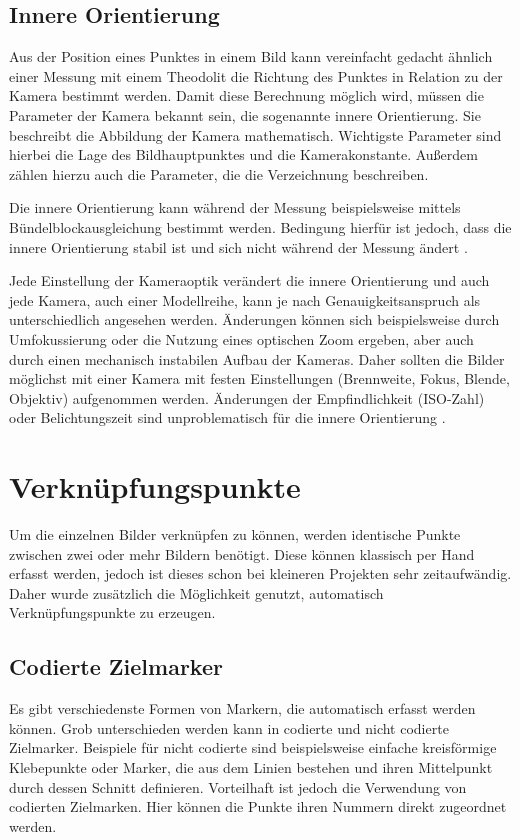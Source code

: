 \documentclass[./00PhotoBox.tex]{subfiles}
\begin{document}

\subsection{Innere Orientierung}
\label{s:innereorientierung}
Aus der Position eines Punktes in einem Bild kann vereinfacht gedacht ähnlich einer Messung mit einem Theodolit die Richtung des Punktes in Relation zu der Kamera bestimmt werden. Damit diese Berechnung möglich wird, müssen die Parameter der Kamera bekannt sein, die sogenannte innere Orientierung. Sie beschreibt die Abbildung der Kamera mathematisch. Wichtigste Parameter sind hierbei die Lage des Bildhauptpunktes und die Kamerakonstante. Außerdem zählen hierzu auch die Parameter, die die Verzeichnung beschreiben. \citep[S. 179f]{luhmann}

Die innere Orientierung kann während der Messung beispielsweise mittels Bündel\-block\-ausgleichung bestimmt werden. Bedingung hierfür ist jedoch, dass die innere Orientierung stabil ist und sich nicht während der Messung ändert \citep[S. 181f]{luhmann}.

Jede Einstellung der Kameraoptik verändert die innere Orientierung und auch jede Kamera, auch einer Modellreihe, kann je nach Genauigkeitsanspruch als unterschiedlich angesehen werden. Änderungen können sich beispielsweise durch Umfokussierung oder die Nutzung eines optischen Zoom ergeben, aber auch durch einen mechanisch instabilen Aufbau der Kameras. Daher sollten die Bilder möglichst mit einer Kamera mit festen Einstellungen (Brennweite, Fokus, Blende, Objektiv) aufgenommen werden. Änderungen der Empfindlichkeit (ISO-Zahl) oder Belichtungszeit sind unproblematisch für die innere Orientierung \citep[S. 176]{luhmann}.

\section{Verknüpfungspunkte}
\label{s:verknuepfung}
Um die einzelnen Bilder verknüpfen zu können, werden identische Punkte zwischen zwei oder mehr Bildern benötigt. Diese können klassisch per Hand erfasst werden, jedoch ist dieses schon bei kleineren Projekten sehr zeitaufwändig. Daher wurde zusätzlich die Möglichkeit genutzt, automatisch Verknüpfungspunkte zu erzeugen.

\subsection{Codierte Zielmarker}
Es gibt verschiedenste Formen von Markern, die automatisch erfasst werden können. Grob unterschieden werden kann in codierte und nicht codierte Zielmarker. Beispiele für nicht codierte sind beispielsweise einfache kreisförmige Klebepunkte oder Marker, die aus dem Linien bestehen und ihren Mittelpunkt durch dessen Schnitt definieren.
Vorteilhaft ist jedoch die Verwendung von codierten Zielmarken. Hier können die Punkte ihren Nummern direkt zugeordnet werden.
\citep[S.535ff]{luhmann}
\end{document}
